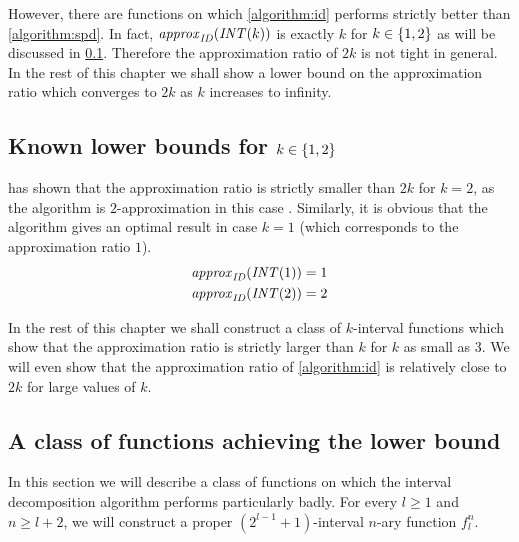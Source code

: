 However,
there are functions on which \cref{algorithm:id} performs strictly better than \cref{algorithm:spd}.
In fact, $\mathit{approx}_{\mathit{ID}} (\mathit{INT} (k))$ is exactly $k$
for $k \in \{1, 2\}$
as will be discussed in \cref{sec:approxidk12}.
Therefore the approximation ratio of $2k$ is not tight
in general.
In the rest of this chapter we shall show a lower bound on the approximation ratio which converges to $2k$ as $k$ increases to infinity.

\subsection{Known lower bounds for $k \in \{1, 2\}$}
\label{sec:approxidk12}

\citeauthor{Dubovsky2012} has shown
that the approximation ratio is strictly smaller than $2k$
for $k = 2$,
as the algorithm is $2$-approximation
in this case \citep[p.~39]{Dubovsky2012}. %
Similarly,
it is obvious that the algorithm
gives an optimal result in case $k = 1$
(which corresponds to the approximation ratio $1$).
\begin{align}
\mathit{approx}_{\mathit{ID}} (\mathit{INT} (1)) &= 1 \\
\mathit{approx}_{\mathit{ID}} (\mathit{INT} (2)) &= 2
\end{align}

In the rest of this chapter
we shall construct a class of $k$-interval functions which show that the approximation ratio is strictly larger than $k$ for $k$ as small as $3$.
We will even show that the approximation ratio of \cref{algorithm:id} is relatively close to $2k$ for large values of $k$.

\subsection{A class of functions achieving the lower bound}
\label{sec:difficultfns}

In this section we will describe a class of functions
on which the interval decomposition algorithm
performs particularly badly.
For every $l \geq 1$ and $n \geq l+2$,
we will construct
a proper $(2^{l-1} + 1)$-interval $n$-ary function $f_l^n$.

